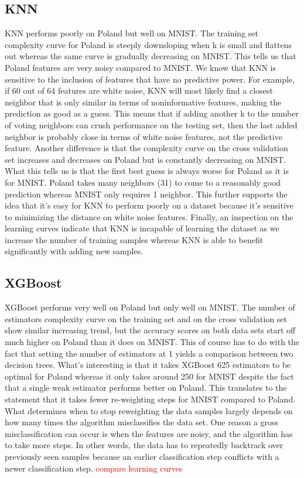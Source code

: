 \documentclass{article}
\newcommand\todo[1]{\textcolor{red}{#1}}
\begin{document}
\subsection{KNN}
KNN performs poorly on Poland but well on MNIST. The training set complexity curve for Poland is steeply downsloping when k is small and flattens out whereas the same curve is gradually decreasing on MNIST. This tells us that Poland features are very noisy compared to MNIST. We know that KNN is sensitive to the inclusion of features that have no predictive power. For example, if 60 out of 64 features are white noise, KNN will most likely find a closest neighbor that is only similar in terms of noninformative features, making the prediction as good as a guess. This means that if adding another k to the number of voting neighbors can crush performance on the testing set, then the last added neighbor is probably close in terms of white noise features, not the predictive feature. Another difference is that the complexity curve on the cross validation set increases and decreases on Poland but is constantly decreasing on MNIST. What this tells us is that the first best guess is always worse for Poland as it is for MNIST. Poland takes many neighbors (31) to come to a reasonably good prediction whereas MNIST only requires 1 neighbor. This further supports the idea that it's easy for KNN to perform poorly on a dataset because it's sensitive to minimizing the distance on white noise features. Finally, an inspection on the learning curves indicate that KNN is incapable of learning the dataset as we increase the number of training samples whereas KNN is able to benefit significantly with adding new samples. 


\subsection*{XGBoost}
XGBoost performs very well on Poland but only well on MNIST. The number of estimators complexity curve on the training set and on the cross validation set show similar increasing trend, but the accuracy scores on both data sets start off much higher on Poland than it does on MNIST. This of course has to do with the fact that setting the number of estimators at 1 yields a comparison between two decision trees. What's interesting is that it takes XGBoost 625 estimators to be optimal for Poland whereas it only takes around 250 for MNIST despite the fact that a single weak estimator performs better on Poland. This translates to the statement that it takes fewer re-weighting steps for MNIST compared to Poland. What determines when to stop reweighting the data samples largely depends on how many times the algorithm misclassifies the data set. One reason a gross misclassification can occur is when the features are noisy, and the algorithm has to take more steps. In other words, the data has to repeatedly backtrack over previously seen samples because an earlier classification step conflicts with a newer classification step. \todo{compare learning curves}
\end{document}
